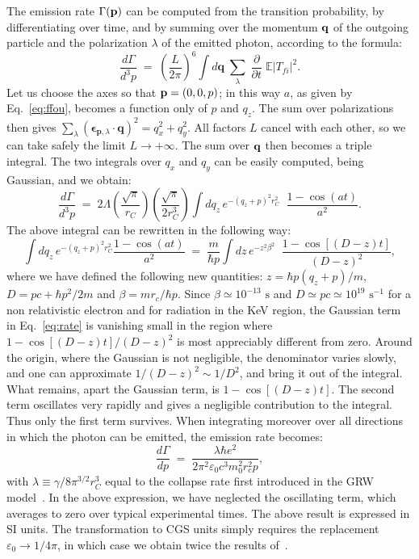 \documentclass[12pt,onecolumn,amssymb,nofootinbib]{revtex4-2} %
\newcommand*{\boldvec}[1]{\ensuremath{\boldsymbol{#1}}}%
\let\vec\boldvec%
\begin{document}
The emission rate $\Gamma({\bf p})$ can be computed from the transition
probability, by differentiating over time, and by summing over the momentum
${\bf q}$ of the outgoing particle and the polarization $\lambda$ of the
emitted photon, according to the formula:
\begin{equation}
\frac{d\Gamma}{d^{3}p} \; = \; \left(\frac{L}{2\pi}\right)^{6}\int d\mathbf{q}
\; \underset{\lambda}{\sum}\; \frac{\partial}{\partial
t}\; \mathbb{E}| T_{fi} |^{2}.
\end{equation}
Let us choose the axes so that ${\bf p} = (0,0,p)$; in this way $a$, as given
by Eq.~\eqref{eq:ffou}, becomes a function only of $p$ and $q_z$.  The sum over
polarizations then gives $\sum_{\lambda} (\vec{\epsilon}_{\mathbf{p},\lambda}
\cdot \mathbf{q})^{2} = q_x^2 + q_y^2$. All factors $L$ cancel with each other,
so we can take safely the limit $L \rightarrow + \infty$. The sum over ${\bf
q}$ then becomes a triple integral. The two integrals over $q_x$ and $q_y$ can
be easily computed, being Gaussian, and we obtain:
\begin{equation} \label{eq:rate}
\frac{d\Gamma}{d^{3}p} \; = \; 2 \Lambda \left(
\frac{\sqrt{\pi}}{r_C}\right) \left( \frac{\sqrt{\pi}}{2 r_C^3}
\right) \int dq_z\, e^{-(q_z + p)^2 r_C^2}\;\;
\frac{1-\cos(at)}{a^{2}}.
\end{equation}
The above integral can be rewritten in the following way:
\begin{equation}
\int dq_z\, e^{-(q_z + p)^2 r_C^2}  \frac{1-\cos(at)}{a^{2}} \; = \;
\frac{m}{\hbar p} \int dz \, e^{-z^2\beta^2}\;\; \frac{1 - \cos[(D -
z)t]}{(D - z)^2},
\end{equation}
where we have defined the following new quantities: $z = \hbar p (q_z + p)/m$,
$D = pc + \hbar p^2/2m$ and $\beta = m r_c/ \hbar p$. Since $\beta \simeq
10^{-13}\textrm{ s}$ and $D \simeq pc \simeq 10^{19}\textrm{ s}^{-1}$ for a non
relativistic electron and for radiation in the KeV region, the Gaussian term in
Eq.~\eqref{eq:rate} is vanishing small in the region where $1 - \cos[(D - z)t]/(D - z)^2$ is most appreciably different from zero. Around the origin, where the Gaussian is not negligible, the denominator varies slowly, and one can approximate $1/(D - z)^2 \sim 1/D^2$, and bring it out of the integral. What remains, apart the Gaussian term, is $1 - \cos[(D - z)t]$. The second term oscillates very rapidly and gives a negligible contribution to the integral. Thus only the first term survives.
When integrating moreover over all directions in which the photon can be
emitted, the emission rate becomes:
\begin{equation} \label{eq:rate quasi finale}
\frac{d\Gamma}{dp} \; = \; \frac{\lambda\hbar e^{2}}{2\pi^{2}\varepsilon_{0}c^{3}m_{0}^{2}r_
{c}^{2}p},
\end{equation}
with $\lambda \equiv \gamma/8\pi^{3/2}r_{C}^{3}$ equal to the collapse rate
first introduced in the GRW model~\cite{ref:grw}. In the above expression, we have
neglected the oscillating term, which averages to zero over typical
experimental times. The above result is expressed in SI units. The
transformation to CGS units simply requires the replacement $\varepsilon_{0}
\rightarrow 1/4\pi$, in which case we obtain twice the results of~\cite{ref:fu,ref:ar}.
\end{document}
